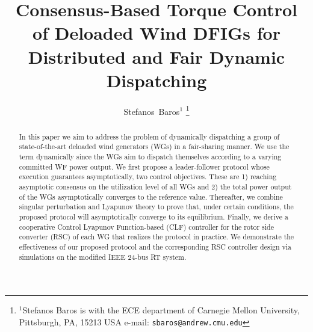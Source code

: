 \documentclass[letterpaper, 10 pt, conference]{ieeeconf}
\title{\LARGE \bf
Consensus-Based Torque Control of Deloaded Wind DFIGs for Distributed and Fair Dynamic Dispatching
}
\author{Stefanos~Baros$^{1}$ 
\thanks{$^{1}$Stefanos Baros is with the ECE department
of Carnegie Mellon University, Pittsburgh, PA, 15213 USA e-mail: {\tt sbaros@andrew.cmu.edu}}}
\begin{document}
\maketitle
\thispagestyle{empty}
\pagestyle{empty}



\begin{abstract}
In this paper we aim to address the problem of dynamically dispatching  a group of state-of-the-art deloaded wind generators (WGs) in a fair-sharing manner. We use the term dynamically since the WGs aim to dispatch themselves according to a varying committed WF power output. We first propose a leader-follower  protocol whose execution guarantees asymptotically, two control objectives. These are 1) reaching asymptotic consensus on the utilization level of all WGs and 2) the total power output of the WGs asymptotically converges to the reference value. Thereafter, we combine singular perturbation and Lyapunov theory to prove that, under certain conditions, the proposed protocol will asymptotically converge to its equilibrium. Finally, we derive a cooperative Control Lyapunov Function-based (CLF) controller for the rotor side converter (RSC) of each WG that realizes the protocol in practice. We demonstrate the effectiveness of our proposed protocol and the corresponding RSC controller design via simulations on the modified IEEE 24-bus RT system.


 
 
\end{abstract}







\IEEEpeerreviewmaketitle
\end{document}
